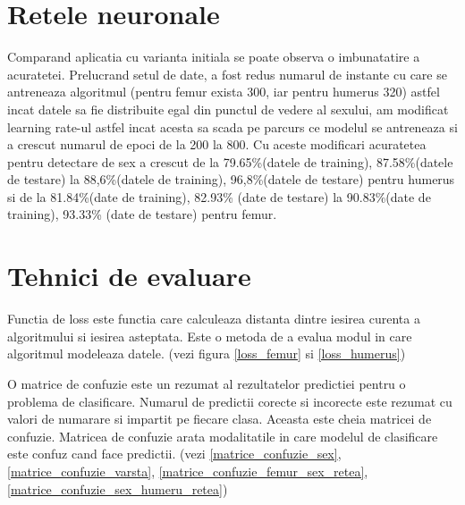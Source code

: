 \documentclass[runningheads,a4paper,11pt]{report}
\begin{document}
\section{Retele neuronale}
\label{reteleComplexitate}
Comparand aplicatia cu varianta initiala se poate observa o imbunatatire a acuratetei. Prelucrand setul de date, a fost redus numarul de instante cu care se antreneaza algoritmul (pentru femur exista 300, iar pentru humerus 320) astfel incat datele sa fie distribuite egal din punctul de vedere al sexului, am modificat learning rate-ul astfel incat acesta sa scada pe parcurs ce modelul se antreneaza si a crescut numarul de epoci de la 200 la 800.
Cu aceste modificari acuratetea pentru detectare de sex a crescut de la 79.65\%(datele de training), 87.58\%(datele de testare) la 88,6\%(datele de training), 96,8\%(datele de testare) pentru humerus si de la 81.84\%(date de training), 82.93\% (date de testare) la 90.83\%(date de training), 93.33\% (date de testare) pentru femur. \newline \newline

\section{Tehnici de evaluare}
\label{tehnici}
Functia de loss este functia care calculeaza distanta dintre iesirea curenta a algoritmului si iesirea asteptata. Este o metoda de a evalua modul in care algoritmul modeleaza datele. (vezi figura \ref{loss_femur} si \ref{loss_humerus})
\newline

\noindent O matrice de confuzie este un rezumat al rezultatelor predictiei pentru o problema de clasificare. Numarul de predictii corecte si incorecte este rezumat cu valori de numarare si impartit pe fiecare clasa. Aceasta este cheia matricei de confuzie. Matricea de confuzie arata modalitatile in care modelul de clasificare este confuz cand face predictii. (vezi \ref{matrice_confuzie_sex}, \ref{matrice_confuzie_varsta}, \ref{matrice_confuzie_femur_sex_retea}, \ref{matrice_confuzie_sex_humeru_retea})

\hfill \break
\hfill \break
\hfill \break
\end{document}
